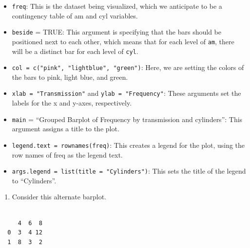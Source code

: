 \documentclass[
  letterpaper,
  DIV=11,
  numbers=noendperiod]{scrreport}
\newenvironment{Shaded}{\begin{snugshade}}{\end{snugshade}}
\newcommand{\CommentTok}[1]{\textcolor[rgb]{0.37,0.37,0.37}{#1}}
\newcommand{\FunctionTok}[1]{\textcolor[rgb]{0.28,0.35,0.67}{#1}}
\newcommand{\NormalTok}[1]{\textcolor[rgb]{0.00,0.23,0.31}{#1}}
\newcommand{\OtherTok}[1]{\textcolor[rgb]{0.00,0.23,0.31}{#1}}
\newcommand{\SpecialCharTok}[1]{\textcolor[rgb]{0.37,0.37,0.37}{#1}}
\providecommand{\tightlist}{%
  \setlength{\itemsep}{0pt}\setlength{\parskip}{0pt}}\usepackage{longtable,booktabs,array}
\begin{document}
\begin{itemize}
\item
  \texttt{freq}: This is the dataset being visualized, which we
  anticipate to be a contingency table of am and cyl variables.
\item
  \texttt{beside} = TRUE: This argument is specifying that the bars
  should be positioned next to each other, which means that for each
  level of \texttt{am}, there will be a distinct bar for each level of
  \texttt{cyl}.
\item
  \texttt{col\ =\ c("pink",\ "lightblue",\ "green")}: Here, we are
  setting the colors of the bars to pink, light blue, and green.
\item
  \texttt{xlab\ =\ "Transmission"} and \texttt{ylab\ =\ "Frequency"}:
  These arguments set the labels for the x and y-axes, respectively.
\item
  \texttt{main} = ``Grouped Barplot of Frequency by transmission and
  cylinders'': This argument assigns a title to the plot.
\item
  \texttt{legend.text\ =\ rownames(freq)}: This creates a legend for the
  plot, using the row names of freq as the legend text.
\item
  \texttt{args.legend\ =\ list(title\ =\ "Cylinders")}: This sets the
  title of the legend to ``Cylinders''.
\end{itemize}

\begin{enumerate}
\def\labelenumi{\arabic{enumi}.}
\setcounter{enumi}{5}
\tightlist
\item
  Consider this alternate barplot.
\end{enumerate}

\begin{Shaded}
\end{Shaded}

\begin{verbatim}
   
     4  6  8
  0  3  4 12
  1  8  3  2
\end{verbatim}
\end{document}
